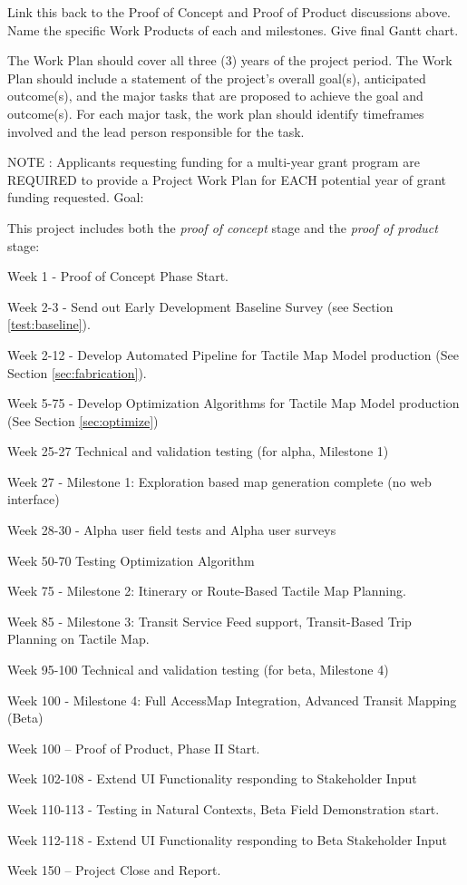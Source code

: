 \label{sec:workplan}

Link this back to the Proof of Concept and Proof of Product discussions above. 
Name the specific Work Products of each and milestones. Give final Gantt chart.

The Work Plan should cover all three (3) years of the project period. The Work Plan should include a statement of the project's overall goal(s), anticipated outcome(s), and the major tasks that are proposed to achieve the goal and outcome(s). For each major task, the work plan should identify timeframes involved and the lead person responsible for the task.

NOTE : Applicants requesting funding for a multi-year grant program are REQUIRED to provide a Project Work Plan for EACH potential year of grant funding requested.
Goal:


This project includes both the \textit{proof of concept} stage and the \textit{proof of product} stage:
\begin{description}
\item Week 1 - Proof of Concept Phase Start. 
\item Week 2-3 - Send out Early Development Baseline Survey (see Section \ref{test:baseline}).
\item Week 2-12 - Develop Automated Pipeline for Tactile Map Model production (See Section \ref{sec:fabrication}).
\item Week 5-75 - Develop Optimization Algorithms for Tactile Map Model production (See Section \ref{sec:optimize})
\item Week 25-27 Technical and validation testing (for alpha, Milestone 1)
\item Week 27 - Milestone 1: Exploration based map generation complete (no web interface)
\item Week 28-30 - Alpha user field tests and Alpha user surveys
\item Week 50-70 Testing Optimization Algorithm
\item Week 75 - Milestone 2: Itinerary or Route-Based Tactile Map Planning.
\item Week 85 - Milestone 3: Transit Service Feed support, Transit-Based Trip Planning on Tactile Map.
\item Week 95-100 Technical and validation testing (for beta, Milestone 4)
\item Week 100 - Milestone 4: Full AccessMap Integration, Advanced Transit Mapping (Beta)
\item Week 100 – Proof of Product, Phase II Start. 
\item Week 102-108 - Extend UI Functionality responding to Stakeholder Input
\item Week 110-113 - Testing in Natural Contexts, Beta Field Demonstration start.
\item Week 112-118 - Extend UI Functionality responding to Beta Stakeholder Input
\item Week 150 – Project Close and Report.

\end{description}

